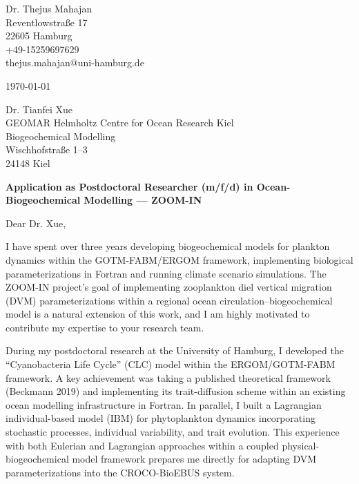 \documentclass[9pt, a4paper]{extarticle}
\begin{document}
\pagestyle{empty}

\begin{flushleft}
Dr. Thejus Mahajan\\
Reventlowstra{\ss}e 17\\
22605 Hamburg\\
+49-15259697629\\
thejus.mahajan@uni-hamburg.de
\end{flushleft}

\vspace{0.05cm}

\begin{flushright}
\today
\end{flushright}

\vspace{0.05cm}

\begin{flushleft}
Dr. Tianfei Xue\\
GEOMAR Helmholtz Centre for Ocean Research Kiel\\
Biogeochemical Modelling\\
Wischhofstra{\ss}e 1--3\\
24148 Kiel
\end{flushleft}

\vspace{0.05cm}

\textbf{Application as Postdoctoral Researcher (m/f/d) in Ocean-Biogeochemical Modelling --- ZOOM-IN}

\vspace{0.05cm}

Dear Dr. Xue,

I have spent over three years developing biogeochemical models for plankton dynamics within the GOTM-FABM/ERGOM framework, implementing biological parameterizations in Fortran and running climate scenario simulations. The ZOOM-IN project's goal of implementing zooplankton diel vertical migration (DVM) parameterizations within a regional ocean circulation--biogeochemical model is a natural extension of this work, and I am highly motivated to contribute my expertise to your research team.

During my postdoctoral research at the University of Hamburg, I developed the ``Cyanobacteria Life Cycle'' (CLC) model within the ERGOM/GOTM-FABM framework. A key achievement was taking a published theoretical framework (Beckmann 2019) and implementing its trait-diffusion scheme within an existing ocean modelling infrastructure in Fortran. In parallel, I built a Lagrangian individual-based model (IBM) for phytoplankton dynamics incorporating stochastic processes, individual variability, and trait evolution. This experience with both Eulerian and Lagrangian approaches within a coupled physical-biogeochemical model framework prepares me directly for adapting DVM parameterizations into the CROCO-BioEBUS system.
\end{document}
